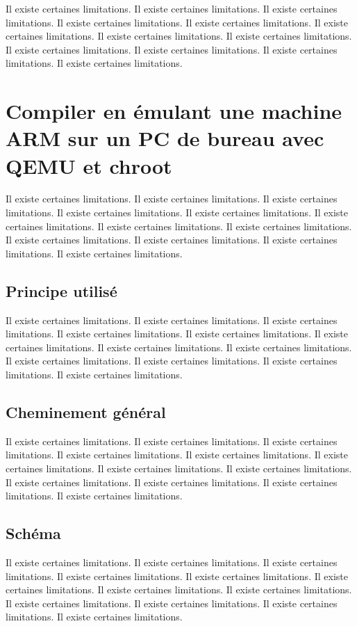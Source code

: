 \documentclass[11pt,a4paper,oneside]{report}
\begin{document}
Il existe certaines limitations.
Il existe certaines limitations.
Il existe certaines limitations.
Il existe certaines limitations.
Il existe certaines limitations.
Il existe certaines limitations.
Il existe certaines limitations.
Il existe certaines limitations.
Il existe certaines limitations.
Il existe certaines limitations.
Il existe certaines limitations.
Il existe certaines limitations.


\section{Compiler en émulant une machine ARM sur un PC de bureau avec QEMU et chroot}

Il existe certaines limitations.
Il existe certaines limitations.
Il existe certaines limitations.
Il existe certaines limitations.
Il existe certaines limitations.
Il existe certaines limitations.
Il existe certaines limitations.
Il existe certaines limitations.
Il existe certaines limitations.
Il existe certaines limitations.
Il existe certaines limitations.
Il existe certaines limitations.
\subsection{Principe utilisé}

Il existe certaines limitations.
Il existe certaines limitations.
Il existe certaines limitations.
Il existe certaines limitations.
Il existe certaines limitations.
Il existe certaines limitations.
Il existe certaines limitations.
Il existe certaines limitations.
Il existe certaines limitations.
Il existe certaines limitations.
Il existe certaines limitations.
Il existe certaines limitations.
\subsection{Cheminement général}

Il existe certaines limitations.
Il existe certaines limitations.
Il existe certaines limitations.
Il existe certaines limitations.
Il existe certaines limitations.
Il existe certaines limitations.
Il existe certaines limitations.
Il existe certaines limitations.
Il existe certaines limitations.
Il existe certaines limitations.
Il existe certaines limitations.
Il existe certaines limitations.
\subsection{Schéma}

Il existe certaines limitations.
Il existe certaines limitations.
Il existe certaines limitations.
Il existe certaines limitations.
Il existe certaines limitations.
Il existe certaines limitations.
Il existe certaines limitations.
Il existe certaines limitations.
Il existe certaines limitations.
Il existe certaines limitations.
Il existe certaines limitations.
Il existe certaines limitations.
\end{document}
